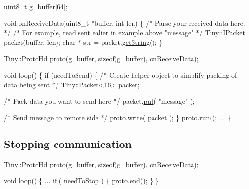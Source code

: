 \begin{DoxyCode}
uint8\_t g\_buffer[64];

\textcolor{keywordtype}{void} onReceiveData(uint8\_t *buffer, \textcolor{keywordtype}{int} len)
\{
    \textcolor{comment}{/* Parse your received data here. */}
    \textcolor{comment}{/* For example, read sent ealier in example above "message" */}
    \hyperlink{classTiny_1_1IPacket}{Tiny::IPacket} packet(buffer, len);
    \textcolor{keywordtype}{char} * str = packet.\hyperlink{classTiny_1_1IPacket_ac6e6a22ce9a652954491a8d4db081d79}{getString}();
\}

\hyperlink{classTiny_1_1ProtoHd}{Tiny::ProtoHd} proto(g\_buffer, \textcolor{keyword}{sizeof}(g\_buffer), onReceiveData);

\textcolor{keywordtype}{void} loop()
\{
    \textcolor{keywordflow}{if} (needToSend)
    \{
        \textcolor{comment}{/* Create helper object to simplify packing of data being sent */}
        \hyperlink{classTiny_1_1Packet}{Tiny::Packet<16>} packet;

        \textcolor{comment}{/* Pack data you want to send here */}
        packet.\hyperlink{classTiny_1_1IPacket_a9d5ba62a453b9cd364c0e214c245f11d}{put}( \textcolor{stringliteral}{"message"} );

        \textcolor{comment}{/* Send message to remote side */}
        proto.write( packet );
    \}
    proto.run();
    ...
\}
\end{DoxyCode}
\hypertarget{arduino_arduino_tiny_hd_close}{}\subsection{Stopping communication}\label{arduino_arduino_tiny_hd_close}

\begin{DoxyCode}
\hyperlink{classTiny_1_1ProtoHd}{Tiny::ProtoHd} proto(g\_buffer, \textcolor{keyword}{sizeof}(g\_buffer), onReceiveData);

\textcolor{keywordtype}{void} loop()
\{
    ...
    \textcolor{keywordflow}{if} ( needToStop )
    \{
        proto.end();
    \}
\}
\end{DoxyCode}
 